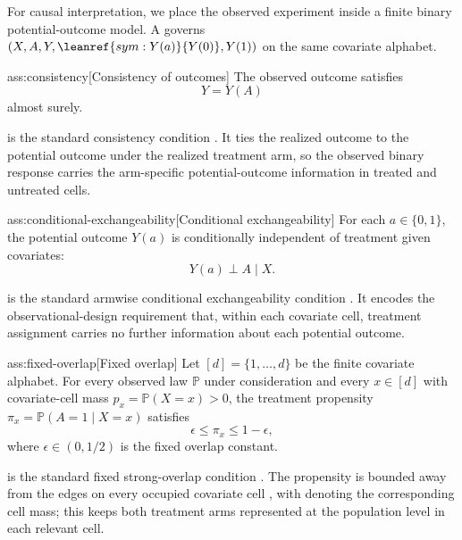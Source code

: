 \documentclass[11pt]{article}
\begin{document}
For causal interpretation, we place the observed experiment inside a finite binary potential-outcome model. A   governs \((X,A,Y,\leanref{sym:Y(a)}{\ensuremath{Y(0)}},Y(1))\) on the same covariate alphabet.

\begin{assumptionv}{ass:consistency}[Consistency of outcomes]
The observed outcome satisfies
\[
Y=Y(A)
\]
almost surely.
\end{assumptionv}

 is the standard consistency condition \citep{ZengBalakrishnanHanKennedy2024Discrete}. It ties the realized outcome to the potential outcome under the realized treatment arm, so the observed binary response carries the arm-specific potential-outcome information in treated and untreated cells.

\begin{assumptionv}{ass:conditional-exchangeability}[Conditional exchangeability]
For each \(a\in\{0,1\}\), the potential outcome \(Y(a)\) is conditionally independent of treatment given covariates:
\[
Y(a)\perp A\mid X .
\]
\end{assumptionv}

 is the standard armwise conditional exchangeability condition \citep{ZengBalakrishnanHanKennedy2024Discrete}. It encodes the observational-design requirement that, within each covariate cell, treatment assignment carries no further information about each potential outcome.

\begin{assumptionv}{ass:fixed-overlap}[Fixed overlap]
Let \([d]=\{1,\ldots,d\}\) be the finite covariate alphabet. For every observed law \(\mathbb P\) under consideration and every \(x\in[d]\) with covariate-cell mass \(p_x=\mathbb P(X=x)>0\), the treatment propensity \(\pi_x=\mathbb P(A=1\mid X=x)\) satisfies
\[
\epsilon\leq \pi_x \leq 1-\epsilon ,
\]
where \(\epsilon\in(0,1/2)\) is the fixed overlap constant.
\end{assumptionv}

 is the standard fixed strong-overlap condition \citep{ZengBalakrishnanHanKennedy2024Discrete}. The propensity  is bounded away from the edges on every occupied covariate cell , with  denoting the corresponding cell mass; this keeps both treatment arms represented at the population level in each relevant cell.
\end{document}
